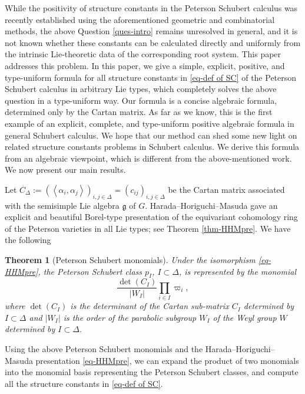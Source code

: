 \documentclass[11pt, letterpaper]{amsart}
\numberwithin{equation}{section}
\newtheorem{theorem}{Theorem}[section]
\begin{document}
While the positivity of structure constants in the Peterson Schubert calculus was recently established using the aforementioned geometric and combinatorial methods, the above Question \ref{ques-intro} remains unresolved in general, and it is not known whether these constants can be calculated directly and uniformly from the intrinsic Lie-theoretic data of the corresponding root system. This paper addresses this problem. In this paper, we give a simple, explicit, positive, and type-uniform formula for all structure constants in \eqref{eq-def of SC} of the Peterson Schubert calculus in arbitrary Lie types, which completely solves the above question in a type-uniform way. Our formula is a concise algebraic formula, determined only by the Cartan matrix. As far as we know, this is the first example of an explicit, complete, and type-uniform positive algebraic formula in general Schubert calculus. We hope that our method can shed some new light on related structure constants problems in Schubert calculus. We derive this formula from an algebraic viewpoint, which is different from the above-mentioned work. We now present our main results.

Let $C_\Delta:=\left(\left\langle\alpha_i, \alpha_j\right\rangle\right)_{i, j \in \Delta}=(c_{ij})_{i, j \in \Delta}$ be the Cartan matrix associated with the semisimple Lie algebra $\mathfrak{g}$ of $G$. Harada--Horiguchi--Masuda \cite{harada2015equivariant} gave an explicit and beautiful Borel-type presentation of the equivariant cohomology ring of the Peterson varieties in all Lie types; see Theorem \ref{thm-HHMpre}.
We have the following

\begin{theorem}[Peterson Schubert monomials]
Under the isomorphism \eqref{eq-HHMpre}, the Peterson Schubert class $p_I$, $I \subset \Delta$, is represented by the monomial 
\begin{equation} 
\frac{\operatorname{det}\left(C_I\right)}{\left|W_I\right|}\prod_{i \in I} \varpi_i, 
\end{equation}
where $\operatorname{det}\left(C_I\right)$ is the determinant of the Cartan sub-matrix $C_I$ determined by $I\subset\Delta$ and $\left|W_I\right|$ is the order of the parabolic subgroup $W_I$ of the Weyl group $W$ determined by $I\subset\Delta$.    
\end{theorem}

Using the above Peterson Schubert monomials and the Harada--Horiguchi--Masuda presentation \eqref{eq-HHMpre}, we can expand the product of two monomials into the monomial basis representing the Peterson Schubert classes, and compute all the structure constants in \eqref{eq-def of SC}. 
 
\end{document}
